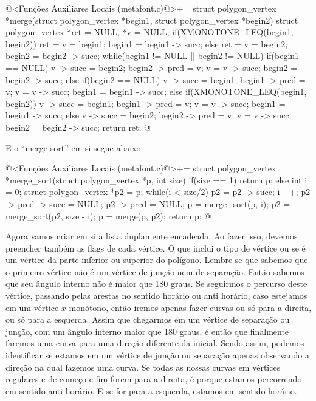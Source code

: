 {{{{{{\iniciocodigo
@<Funções Auxiliares Locais (metafont.c)@>+=
struct polygon_vertex *merge(struct polygon_vertex *begin1,
                             struct polygon_vertex *begin2){
  struct polygon_vertex *ret = NULL, *v = NULL;
  if(XMONOTONE_LEQ(begin1, begin2)){
    ret = v = begin1;
    begin1 = begin1 -> succ;
  }
  else{
    ret = v = begin2;
    begin2 = begin2 -> succ;
  }
  while(begin1 != NULL || begin2 != NULL){
    if(begin1 == NULL){
      v -> succ = begin2;
      begin2 -> pred = v;
      v = v -> succ;
      begin2 = begin2 -> succ;
    }
    else if(begin2 == NULL){
      v -> succ = begin1;
      begin1 -> pred = v;
      v = v -> succ;
      begin1 = begin1 -> succ;
    }
    else if(XMONOTONE_LEQ(begin1, begin2)){
      v -> succ = begin1;
      begin1 -> pred = v;
      v = v -> succ;
      begin1 = begin1 -> succ;
    }
    else{
      v -> succ = begin2;
      begin2 -> pred = v;
      v = v -> succ;
      begin2 = begin2 -> succ;
    }
  }
  return ret;
}
@
\fimcodigo

E o ``merge sort'' em si segue abaixo:

\iniciocodigo
@<Funções Auxiliares Locais (metafont.c)@>+=
struct polygon_vertex *merge_sort(struct polygon_vertex *p, int size){
  if(size == 1)
    return p;
  else{
    int i = 0;
    struct polygon_vertex *p2 = p;
    while(i < size/2){
      p2 = p2 -> succ;
      i ++;
    }
    p2 -> pred -> succ = NULL;
    p2 -> pred = NULL;
    p = merge_sort(p, i);
    p2 = merge_sort(p2, size - i);
    p = merge(p, p2);
    return p;
  }
}
@
\fimcodigo

Agora vamos criar em si a lista duplamente encadeada. Ao fazer isso,
devemos preencher também as flags de cada vértice. O que inclui o tipo
de vértice ou se é um vértice da parte inferior ou superior do
polígono. Lembre-se que sabemos que o primeiro vértice não é um
vértice de junção nem de separação. Então sabemos que seu ângulo
interno não é maior que 180 graus. Se seguirmos o percurso deste
vértice, passando pelas arestas no sentido horário ou anti horário,
caso estejamos em um vértice $x$-monótono, então iremos apenas fazer
curvas ou só para a direita, ou só para a esquerda. Assim que
chegarmos em um vértice de separação ou junção, com um ângulo interno
maior que 180 graus, é então que finalmente faremos uma curva para uma
direção diferente da inicial. Sendo assim, podemos identificar se
estamos em um vértice de junção ou separação apenas observando a
direção na qual fazemos uma curva. Se todas as nossas curvas em
vértices regulares e de começo e fim forem para a direita, é porque
estamos percorrendo em sentido anti-horário. E se for para a esquerda,
estamos em sentido horário.

}}}}}}
